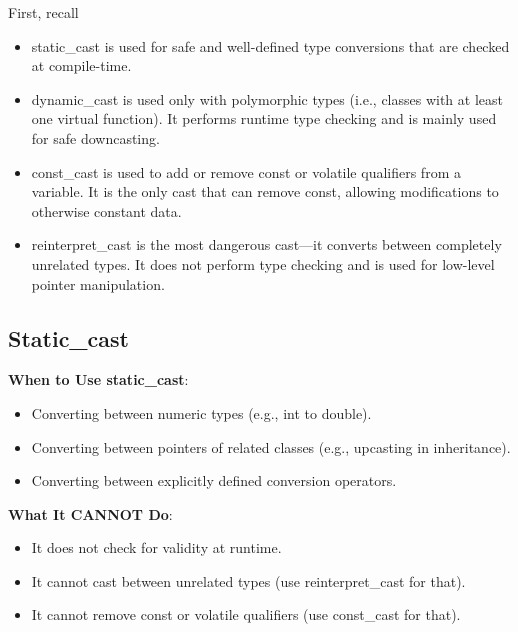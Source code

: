 \documentclass{report}
\begin{document}
    
    \pagebreak 
    \bigbreak \noindent 
    First, recall
    \begin{itemize}
        \item static\_cast is used for safe and well-defined type conversions that are checked at compile-time.
        \item dynamic\_cast is used only with polymorphic types (i.e., classes with at least one virtual function). It performs runtime type checking and is mainly used for safe downcasting.
        \item const\_cast is used to add or remove const or volatile qualifiers from a variable. It is the only cast that can remove const, allowing modifications to otherwise constant data.
        \item reinterpret\_cast is the most dangerous cast—it converts between completely unrelated types. It does not perform type checking and is used for low-level pointer manipulation.
    \end{itemize}
    \bigbreak \noindent 
    \subsection{Static\_cast}
    \bigbreak \noindent 
    \textbf{When to Use static\_cast}:
    \bigbreak \noindent 
    \begin{itemize}
        \item Converting between numeric types (e.g., int to double).
        \item Converting between pointers of related classes (e.g., upcasting in inheritance).
        \item Converting between explicitly defined conversion operators.
    \end{itemize}
    \bigbreak \noindent 
    \textbf{What It CANNOT Do}:
    \begin{itemize}
        \item It does not check for validity at runtime.
        \item It cannot cast between unrelated types (use reinterpret\_cast for that).
        \item It cannot remove const or volatile qualifiers (use const\_cast for that).
    \end{itemize}
    \bigbreak \noindent 
\end{document}
